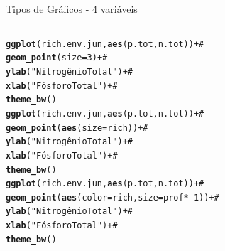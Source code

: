 \documentclass{beamer}\usepackage[]{graphicx}\usepackage[]{color}
\makeatletter
\newcommand{\hlnum}[1]{\textcolor[rgb]{0.686,0.059,0.569}{#1}}%
\newcommand{\hlstr}[1]{\textcolor[rgb]{0.192,0.494,0.8}{#1}}%
\newcommand{\hlcom}[1]{\textcolor[rgb]{0.678,0.584,0.686}{\textit{#1}}}%
\newcommand{\hlopt}[1]{\textcolor[rgb]{0,0,0}{#1}}%
\newcommand{\hlstd}[1]{\textcolor[rgb]{0.345,0.345,0.345}{#1}}%
\newcommand{\hlkwc}[1]{\textcolor[rgb]{0.333,0.667,0.333}{#1}}%
\newcommand{\hlkwd}[1]{\textcolor[rgb]{0.737,0.353,0.396}{\textbf{#1}}}%
\newenvironment{kframe}{%
 \def\at@end@of@kframe{}%
 \ifinner\ifhmode%
  \def\at@end@of@kframe{\end{minipage}}%
  \begin{minipage}{\columnwidth}%
 \fi\fi%
 \def\FrameCommand##1{\hskip\@totalleftmargin \hskip-\fboxsep
 \colorbox{shadecolor}{##1}\hskip-\fboxsep
     \hskip-\linewidth \hskip-\@totalleftmargin \hskip\columnwidth}%
 \MakeFramed {\advance\hsize-\width
   \@totalleftmargin\z@ \linewidth\hsize
   \@setminipage}}%
 {\par\unskip\endMakeFramed%
 \at@end@of@kframe}
\newenvironment{knitrout}{}{} %
\renewenvironment{knitrout}{\setlength{\topsep}{0mm}}{}
\makeatother
\begin{document}

\begin{frame}[fragile]{Tipos de Gráficos - 4 variáveis}

\begin{columns}[t]



\begin{knitrout}\tiny
{}\color{fgcolor}\begin{kframe}
\begin{alltt}
\hlkwd{ggplot}\hlstd{(rich.env.jun,}\hlkwd{aes}\hlstd{(p.tot,n.tot))} \hlopt{+}\hlcom{#}
  \hlkwd{geom_point}\hlstd{(}\hlkwc{size}\hlstd{=}\hlnum{3}\hlstd{)} \hlopt{+}\hlcom{#}
  \hlkwd{ylab}\hlstd{(}\hlstr{"Nitrogênio Total"}\hlstd{)} \hlopt{+}\hlcom{#}
  \hlkwd{xlab}\hlstd{(}\hlstr{"Fósforo Total"}\hlstd{)} \hlopt{+}\hlcom{#}
  \hlkwd{theme_bw}\hlstd{()}
\hlkwd{ggplot}\hlstd{(rich.env.jun,}\hlkwd{aes}\hlstd{(p.tot,n.tot))} \hlopt{+}\hlcom{#}
  \hlkwd{geom_point}\hlstd{(}\hlkwd{aes}\hlstd{(}\hlkwc{size}\hlstd{=rich))} \hlopt{+}\hlcom{#}
  \hlkwd{ylab}\hlstd{(}\hlstr{"Nitrogênio Total"}\hlstd{)} \hlopt{+}\hlcom{#}
  \hlkwd{xlab}\hlstd{(}\hlstr{"Fósforo Total"}\hlstd{)} \hlopt{+}\hlcom{#}
  \hlkwd{theme_bw}\hlstd{()}
\hlkwd{ggplot}\hlstd{(rich.env.jun,}\hlkwd{aes}\hlstd{(p.tot,n.tot))} \hlopt{+}\hlcom{#}
  \hlkwd{geom_point}\hlstd{(}\hlkwd{aes}\hlstd{(}\hlkwc{color}\hlstd{=rich,} \hlkwc{size}\hlstd{=prof}\hlopt{*-}\hlnum{1}\hlstd{))} \hlopt{+}\hlcom{#}
  \hlkwd{ylab}\hlstd{(}\hlstr{"Nitrogênio Total"}\hlstd{)} \hlopt{+}\hlcom{#}
  \hlkwd{xlab}\hlstd{(}\hlstr{"Fósforo Total"}\hlstd{)} \hlopt{+}\hlcom{#}
  \hlkwd{theme_bw}\hlstd{()}
\end{alltt}
\end{kframe}
\end{knitrout}



\end{columns}
\end{frame}
\end{document}
